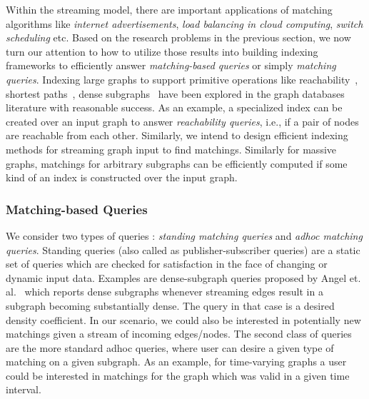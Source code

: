\documentclass{scrartcl}
\begin{document}
Within the streaming model, there are important applications of matching algorithms like \emph{internet advertisements}, \emph{load balancing in cloud computing}, \emph{switch scheduling} etc. Based on the research problems in the previous section, we now turn our attention to how to utilize those results into building indexing frameworks to efficiently answer \emph{matching-based queries} or simply \emph{matching queries}. Indexing large graphs to support primitive operations like reachability~\cite{seufert2013ferrari}, shortest paths~\cite{Gubichev:2010}, dense subgraphs~\cite{angel_dense_2013} have been explored in the graph databases literature with reasonable success.  As an example, a specialized index can be created over an input graph to answer \emph{reachability queries}, i.e., if a pair of nodes are reachable from each other. Similarly, we intend to design efficient indexing methods for streaming graph input to find matchings. Similarly for massive graphs, matchings for arbitrary subgraphs can be efficiently computed if some kind of an index is constructed over the input graph.

\subsubsection{Matching-based Queries} 
We consider two types of queries : \emph{standing matching queries} and \emph{adhoc matching queries}. Standing queries (also called as publisher-subscriber queries) are a static set of queries which are checked for satisfaction in the face of changing or dynamic input data. Examples are dense-subgraph queries proposed by Angel et. al.~\cite{angel_dense_2013} which reports dense subgraphs whenever streaming edges result in a subgraph becoming substantially dense. The query in that case is a desired density coefficient. In our scenario, we could also be interested in potentially new matchings given a stream of incoming edges/nodes. The second class of queries are the more standard adhoc queries, where user can desire a given type of matching on a given subgraph. As an example, for time-varying graphs a user could be interested in matchings for the graph which was valid in a given time interval.
\end{document}
